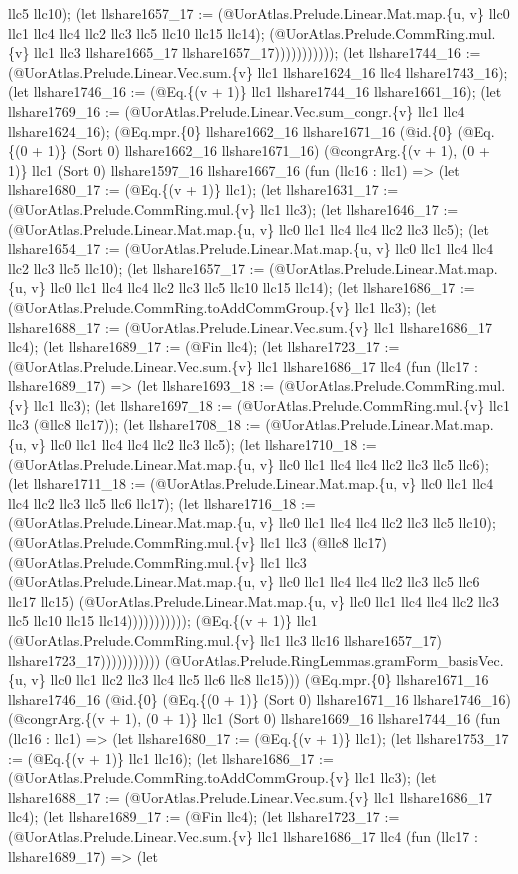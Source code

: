 \documentclass[11pt]{article}
\begin{document}
llc5 llc10); (let llshare1657\_17 := (@UorAtlas.Prelude.Linear.Mat.map.\{u, v\} llc0 llc1 llc4 llc4 llc2 llc3 llc5 llc10 llc15 llc14); (@UorAtlas.Prelude.CommRing.mul.\{v\} llc1 llc3 llshare1665\_17 llshare1657\_17))))))))))); (let llshare1744\_16 := (@UorAtlas.Prelude.Linear.Vec.sum.\{v\} llc1 llshare1624\_16 llc4 llshare1743\_16); (let llshare1746\_16 := (@Eq.\{(v + 1)\} llc1 llshare1744\_16 llshare1661\_16); (let llshare1769\_16 := (@UorAtlas.Prelude.Linear.Vec.sum\_congr.\{v\} llc1 llc4 llshare1624\_16); (@Eq.mpr.\{0\} llshare1662\_16 llshare1671\_16 (@id.\{0\} (@Eq.\{(0 + 1)\} (Sort 0) llshare1662\_16 llshare1671\_16) (@congrArg.\{(v + 1), (0 + 1)\} llc1 (Sort 0) llshare1597\_16 llshare1667\_16 (fun (llc16 : llc1) => (let llshare1680\_17 := (@Eq.\{(v + 1)\} llc1); (let llshare1631\_17 := (@UorAtlas.Prelude.CommRing.mul.\{v\} llc1 llc3); (let llshare1646\_17 := (@UorAtlas.Prelude.Linear.Mat.map.\{u, v\} llc0 llc1 llc4 llc4 llc2 llc3 llc5); (let llshare1654\_17 := (@UorAtlas.Prelude.Linear.Mat.map.\{u, v\} llc0 llc1 llc4 llc4 llc2 llc3 llc5 llc10); (let llshare1657\_17 := (@UorAtlas.Prelude.Linear.Mat.map.\{u, v\} llc0 llc1 llc4 llc4 llc2 llc3 llc5 llc10 llc15 llc14); (let llshare1686\_17 := (@UorAtlas.Prelude.CommRing.toAddCommGroup.\{v\} llc1 llc3); (let llshare1688\_17 := (@UorAtlas.Prelude.Linear.Vec.sum.\{v\} llc1 llshare1686\_17 llc4); (let llshare1689\_17 := (@Fin llc4); (let llshare1723\_17 := (@UorAtlas.Prelude.Linear.Vec.sum.\{v\} llc1 llshare1686\_17 llc4 (fun (llc17 : llshare1689\_17) => (let llshare1693\_18 := (@UorAtlas.Prelude.CommRing.mul.\{v\} llc1 llc3); (let llshare1697\_18 := (@UorAtlas.Prelude.CommRing.mul.\{v\} llc1 llc3 (@llc8 llc17)); (let llshare1708\_18 := (@UorAtlas.Prelude.Linear.Mat.map.\{u, v\} llc0 llc1 llc4 llc4 llc2 llc3 llc5); (let llshare1710\_18 := (@UorAtlas.Prelude.Linear.Mat.map.\{u, v\} llc0 llc1 llc4 llc4 llc2 llc3 llc5 llc6); (let llshare1711\_18 := (@UorAtlas.Prelude.Linear.Mat.map.\{u, v\} llc0 llc1 llc4 llc4 llc2 llc3 llc5 llc6 llc17); (let llshare1716\_18 := (@UorAtlas.Prelude.Linear.Mat.map.\{u, v\} llc0 llc1 llc4 llc4 llc2 llc3 llc5 llc10); (@UorAtlas.Prelude.CommRing.mul.\{v\} llc1 llc3 (@llc8 llc17) (@UorAtlas.Prelude.CommRing.mul.\{v\} llc1 llc3 (@UorAtlas.Prelude.Linear.Mat.map.\{u, v\} llc0 llc1 llc4 llc4 llc2 llc3 llc5 llc6 llc17 llc15) (@UorAtlas.Prelude.Linear.Mat.map.\{u, v\} llc0 llc1 llc4 llc4 llc2 llc3 llc5 llc10 llc15 llc14))))))))))); (@Eq.\{(v + 1)\} llc1 (@UorAtlas.Prelude.CommRing.mul.\{v\} llc1 llc3 llc16 llshare1657\_17) llshare1723\_17))))))))))) (@UorAtlas.Prelude.RingLemmas.gramForm\_basisVec.\{u, v\} llc0 llc1 llc2 llc3 llc4 llc5 llc6 llc8 llc15))) (@Eq.mpr.\{0\} llshare1671\_16 llshare1746\_16 (@id.\{0\} (@Eq.\{(0 + 1)\} (Sort 0) llshare1671\_16 llshare1746\_16) (@congrArg.\{(v + 1), (0 + 1)\} llc1 (Sort 0) llshare1669\_16 llshare1744\_16 (fun (llc16 : llc1) => (let llshare1680\_17 := (@Eq.\{(v + 1)\} llc1); (let llshare1753\_17 := (@Eq.\{(v + 1)\} llc1 llc16); (let llshare1686\_17 := (@UorAtlas.Prelude.CommRing.toAddCommGroup.\{v\} llc1 llc3); (let llshare1688\_17 := (@UorAtlas.Prelude.Linear.Vec.sum.\{v\} llc1 llshare1686\_17 llc4); (let llshare1689\_17 := (@Fin llc4); (let llshare1723\_17 := (@UorAtlas.Prelude.Linear.Vec.sum.\{v\} llc1 llshare1686\_17 llc4 (fun (llc17 : llshare1689\_17) => (let 
\end{document}
